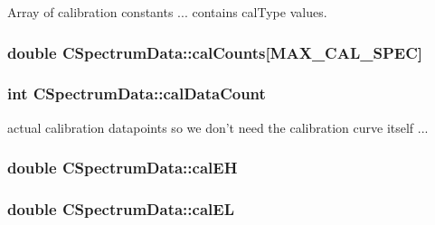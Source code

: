Array of calibration constants ... contains calType values. 

\hypertarget{classCSpectrumData_a71e009941c48149db24e601dce1aaacc}{
\subsubsection[{calCounts}]{\setlength{\rightskip}{0pt plus 5cm}double {\bf CSpectrumData::calCounts}\mbox{[}MAX\_\-CAL\_\-SPEC\mbox{]}}}
\label{classCSpectrumData_a71e009941c48149db24e601dce1aaacc}
\hypertarget{classCSpectrumData_aa3fa478b3ed634cafb00225aafcf136b}{
\subsubsection[{calDataCount}]{\setlength{\rightskip}{0pt plus 5cm}int {\bf CSpectrumData::calDataCount}}}
\label{classCSpectrumData_aa3fa478b3ed634cafb00225aafcf136b}


actual calibration datapoints so we don't need the calibration curve itself ... 

\hypertarget{classCSpectrumData_a6295b0ee3a35dc4f50a627c51a3da4fe}{
\subsubsection[{calEH}]{\setlength{\rightskip}{0pt plus 5cm}double {\bf CSpectrumData::calEH}}}
\label{classCSpectrumData_a6295b0ee3a35dc4f50a627c51a3da4fe}
\hypertarget{classCSpectrumData_a2aef98fe50feed756f5dac805fdcf5ef}{
\subsubsection[{calEL}]{\setlength{\rightskip}{0pt plus 5cm}double {\bf CSpectrumData::calEL}}}
\label{classCSpectrumData_a2aef98fe50feed756f5dac805fdcf5ef}


